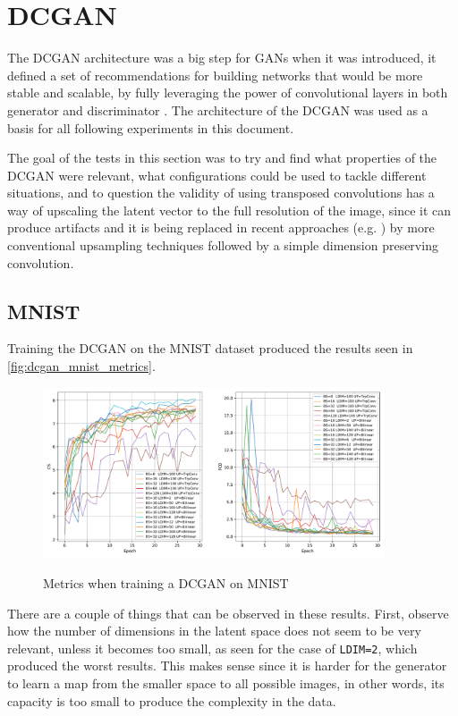 \section{DCGAN}
The \gls{DCGAN} architecture was a big step for \acp{GAN} when it was introduced, it defined a set of recommendations for building networks that would be more stable and scalable, by fully leveraging the power of convolutional layers in both generator and discriminator \cite{dcgan2015}. The architecture of the \gls{DCGAN} was used as a basis for all following experiments in this document.

The goal of the tests in this section was to try and find what properties of the \gls{DCGAN} were relevant, what configurations could be used to tackle different situations, and to question the validity of using transposed convolutions has a way of upscaling the latent vector to the full resolution of the image, since it can produce artifacts \cite{deconvolutionArtifacts2016} and it is being replaced in recent approaches (e.g. \cite{styleGAN2018}) by more conventional upsampling techniques followed by a simple dimension preserving convolution.

\subsection{MNIST}
Training the \gls{DCGAN} on the \gls{MNIST} dataset produced the results seen in \autoref{fig:dcgan_mnist_metrics}.\begin{figure}[hbt]
    \centering
    \caption{Metrics when training a DCGAN on MNIST}
    \includegraphics[width=0.9\textwidth]{chapters/Experiments/DCGAN/mnist_metrics.pdf}
    \label{fig:dcgan_mnist_metrics}
\end{figure}

There are a couple of things that can be observed in these results. First, observe how the number of dimensions in the latent space does not seem to be very relevant, unless it becomes too small, as seen for the case of \texttt{LDIM=2}, which produced the worst results. This makes sense since it is harder for the generator to learn a map from the smaller space to all possible images, in other words, its capacity is too small to produce the complexity in the data.

